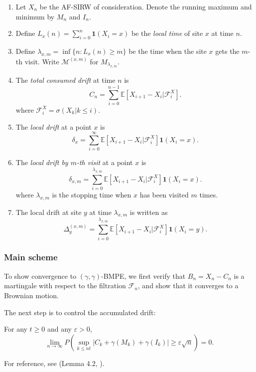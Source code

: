 \begin{enumerate}
	\item 
Let $X_n$ be the AF-SIRW of consideration. Denote the running maximum and minimum by $M_n$ and $I_n$.

\item Define $L_x(n) = \sum_{i = 0}^{n} \mathbf{1}(X_i = x)$ be the \textit{local time} of site $x$ at time $n$.

\item Define $\lambda_{x, m} = \inf \{n: L_x(n) \ge m\} $ be the time when the site $x$ gets the $m$-th visit.
Write $\mathcal{M}^{(x,m)}$ for $M_{\lambda_{x, m}}$.
	\item The \textit{total consumed drift} at time $n$ is
		\[
	C_n = \sum_{i=0}^{n-1} \mathbb{E}\left[ X_{i+1} - X_i | \mathcal{F}_i^X \right] 
		.\] 
where $\mathcal{F}_i^X = \sigma\left( X_k | k \le i \right) $.

	\item 
The \textit{local drift} at a point $x$ is
\[
\delta_{x} = \sum_{i=0}^{\infty} \mathbb{E}\left[ X_{i+1} - X_i | \mathcal{F}_i^X \right] 
\mathbf{1}\left( X_i = x \right) 
.\] 

\item
The \textit{local drift by $m$-th visit} at a point $x$ is
\[
\delta_{x,m} = \sum_{i=0}^{\lambda_{x, m}} \mathbb{E}\left[ X_{i+1} - X_i | \mathcal{F}_i^X \right] 
\mathbf{1}\left( X_i = x \right) 
.\]
where $\lambda_{x,m}$ is the stopping time when $x$ has been visited $m$ times.

\item The local drift at site $y$ at time $\lambda_{x, m}$ is written as
	\[
		\Delta_y^{(x,m)} = \sum_{i=0}^{\lambda_{x, m}} \mathbb{E}\left[ X_{i+1} - X_i | \mathcal{F}_i^X \right] \mathbf{1}(X_i = y)
	.\] 

\end{enumerate}
\subsubsection{Main scheme}


 To show convergence to $(\gamma, \gamma)$-BMPE, we first verify that $B_n = X_n - C_n$ is a martingale with respect to the filtration $\mathcal{F}_n$, and show that it converges to a Brownian motion.

The next step is to control the accumulated drift:

\begin{lemma}
	\label{lem:drift-term}
	For any $t \ge 0$ and any $\varepsilon>0$,
	\[
		\lim_{n \to \infty } P\left( 
		\sup_{k \le n t}
		\left| C_k + \gamma(M_k) + \gamma(I_k) \right| 
		\ge \varepsilon \sqrt{n} 
	\right)  =0
	.\] 
\end{lemma}
For reference, see (Lemma 4.2, \cite{kosyginaFunctionalLimitLaws2016}).

